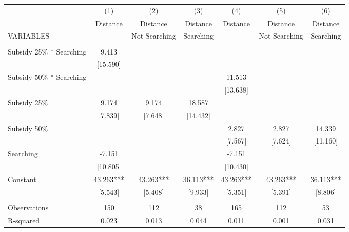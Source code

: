 \begin{tabular}{lcccccc} \hline
 & (1) & (2) & (3) & (4) & (5) & (6) \\
 & Distance & Distance & Distance & Distance & Distance & Distance \\
VARIABLES &  & Not Searching & Searching &  & Not Searching & Searching \\ \hline
 &  &  &  &  &  &  \\
Subsidy 25\% * Searching & 9.413 &  &  &  &  &  \\
 & [15.590] &  &  &  &  &  \\
Subsidy 50\% * Searching &  &  &  & 11.513 &  &  \\
 &  &  &  & [13.638] &  &  \\
Subsidy 25\% & 9.174 & 9.174 & 18.587 &  &  &  \\
 & [7.839] & [7.648] & [14.432] &  &  &  \\
Subsidy 50\% &  &  &  & 2.827 & 2.827 & 14.339 \\
 &  &  &  & [7.567] & [7.624] & [11.160] \\
Searching & -7.151 &  &  & -7.151 &  &  \\
 & [10.805] &  &  & [10.430] &  &  \\
Constant & 43.263*** & 43.263*** & 36.113*** & 43.263*** & 43.263*** & 36.113*** \\
 & [5.543] & [5.408] & [9.933] & [5.351] & [5.391] & [8.806] \\
 &  &  &  &  &  &  \\
Observations & 150 & 112 & 38 & 165 & 112 & 53 \\
 R-squared & 0.023 & 0.013 & 0.044 & 0.011 & 0.001 & 0.031 \\ \hline
\end{tabular}
